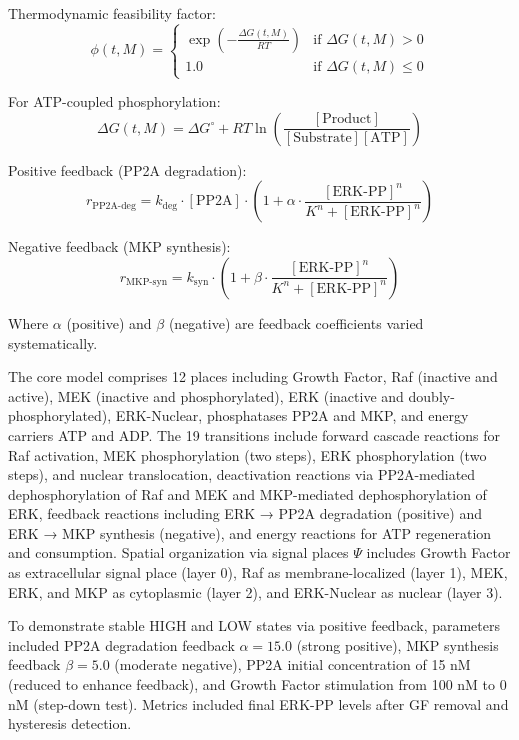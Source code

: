 \documentclass[twocolumn,11pt]{article}
\begin{document}
Thermodynamic feasibility factor:
\begin{equation}
\phi(t, M) = \begin{cases}
\exp\left(-\frac{\Delta G(t,M)}{RT}\right) & \text{if } \Delta G(t,M) > 0 \\
1.0 & \text{if } \Delta G(t,M) \leq 0
\end{cases}
\end{equation}

For ATP-coupled phosphorylation:
\begin{equation}
\Delta G(t,M) = \Delta G^\circ + RT \ln\left(\frac{[\text{Product}]}{[\text{Substrate}][\text{ATP}]}\right)
\end{equation}

Positive feedback (PP2A degradation):
\begin{equation}
r_{\text{PP2A-deg}} = k_{\text{deg}} \cdot [\text{PP2A}] \cdot \left(1 + \alpha \cdot \frac{[\text{ERK-PP}]^n}{K^n + [\text{ERK-PP}]^n}\right)
\end{equation}

Negative feedback (MKP synthesis):
\begin{equation}
r_{\text{MKP-syn}} = k_{\text{syn}} \cdot \left(1 + \beta \cdot \frac{[\text{ERK-PP}]^n}{K^n + [\text{ERK-PP}]^n}\right)
\end{equation}

Where $\alpha$ (positive) and $\beta$ (negative) are feedback coefficients varied systematically.

The core model comprises 12 places including Growth Factor, Raf (inactive and active), MEK (inactive and phosphorylated), ERK (inactive and doubly-phosphorylated), ERK-Nuclear, phosphatases PP2A and MKP, and energy carriers ATP and ADP. The 19 transitions include forward cascade reactions for Raf activation, MEK phosphorylation (two steps), ERK phosphorylation (two steps), and nuclear translocation, deactivation reactions via PP2A-mediated dephosphorylation of Raf and MEK and MKP-mediated dephosphorylation of ERK, feedback reactions including ERK → PP2A degradation (positive) and ERK → MKP synthesis (negative), and energy reactions for ATP regeneration and consumption. Spatial organization via signal places $\Psi$ includes Growth Factor as extracellular signal place (layer 0), Raf as membrane-localized (layer 1), MEK, ERK, and MKP as cytoplasmic (layer 2), and ERK-Nuclear as nuclear (layer 3).

To demonstrate stable HIGH and LOW states via positive feedback, parameters included PP2A degradation feedback $\alpha = 15.0$ (strong positive), MKP synthesis feedback $\beta = 5.0$ (moderate negative), PP2A initial concentration of 15 nM (reduced to enhance feedback), and Growth Factor stimulation from 100 nM to 0 nM (step-down test). Metrics included final ERK-PP levels after GF removal and hysteresis detection.
\end{document}
